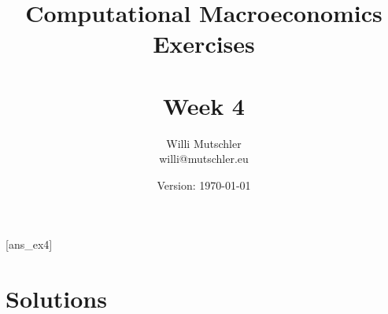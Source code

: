 
\newif\ifDisplaySolutions \DisplaySolutionstrue


\title{Computational Macroeconomics\\Exercises\\~\\Week 4}
\author{Willi Mutschler\\willi@mutschler.eu}
\date{Version: \today}
\maketitle\thispagestyle{empty}

\newpage
{}[ans_ex4]
\tableofcontents\thispagestyle{empty}\newpage
\newpage

\newpage
\newpage
\setcounter{page}{1}

\printbibliography
{}
\ifDisplaySolutions
\newpage
\appendix
\section{Solutions}

\fi
